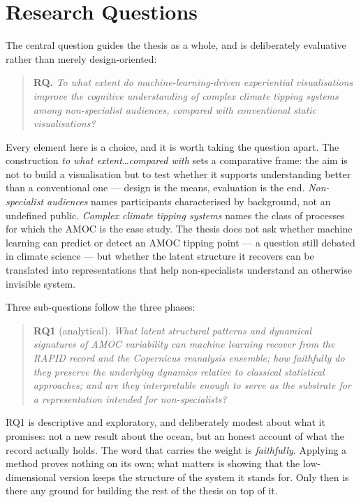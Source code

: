 \section{Research Questions}
\label{sec:rqs}

The central question guides the thesis as a whole, and is deliberately evaluative rather than merely design-oriented:

\begin{quote}
\textbf{RQ.} \emph{To what extent do machine-learning-driven experiential visualisations improve the cognitive understanding of complex climate tipping systems among non-specialist audiences, compared with conventional static visualisations?}
\end{quote}

Every element here is a choice, and it is worth taking the question apart. The construction \emph{to what extent\ldots compared with} sets a comparative frame: the aim is not to build a visualisation but to test whether it supports understanding better than a conventional one --- design is the means, evaluation is the end. \emph{Non-specialist audiences} names participants characterised by background, not an undefined public. \emph{Complex climate tipping systems} names the class of processes for which the AMOC is the case study. The thesis does not ask whether machine learning can predict or detect an AMOC tipping point --- a question still debated in climate science \citep{benyami2024, ditlevsen2023} --- but whether the latent structure it recovers can be translated into representations that help non-specialists understand an otherwise invisible system.

Three sub-questions follow the three phases:

\begin{quote}
\textbf{RQ1} (analytical). \emph{What latent structural patterns and dynamical signatures of AMOC variability can machine learning recover from the RAPID record and the Copernicus reanalysis ensemble; how faithfully do they preserve the underlying dynamics relative to classical statistical approaches; and are they interpretable enough to serve as the substrate for a representation intended for non-specialists?}
\end{quote}

RQ1 is descriptive and exploratory, and deliberately modest about what it promises: not a new result about the ocean, but an honest account of what the record actually holds. The word that carries the weight is \emph{faithfully}. Applying a method proves nothing on its own; what matters is showing that the low-dimensional version keeps the structure of the system it stands for. Only then is there any ground for building the rest of the thesis on top of it.

